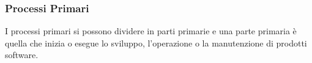 \documentclass[10pt]{article}
\begin{document}
\begin{justify}
\subsubsection{Processi Primari}
I processi primari si possono dividere in parti primarie e una parte primaria è quella che inizia o esegue lo sviluppo, l'operazione o la manutenzione di prodotti software.\\





\end{justify}
\end{document}
